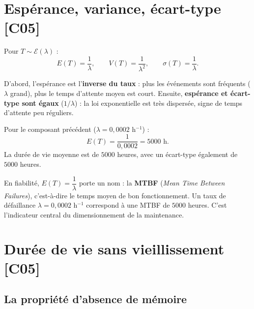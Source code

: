 \documentclass[a4paper,11pt]{article}
\begin{document}
\newpage
\section{Espérance, variance, écart-type \hfill {\normalsize\color{uimmred}[C05]}}

\begin{theoreme}
Pour $T \sim \mathcal{E}(\lambda)$ :
\[
E(T) = \frac{1}{\lambda}, \qquad V(T) = \frac{1}{\lambda^{2}}, \qquad \sigma(T) = \frac{1}{\lambda}.
\]
\end{theoreme}

\begin{remarque}
D'abord, l'espérance est l'\textbf{inverse du taux} : plus les événements sont fréquents ($\lambda$ grand), plus le temps d'attente moyen est court. Ensuite, \textbf{espérance et écart-type sont égaux} ($1/\lambda$) : la loi exponentielle est très dispersée, signe de temps d'attente peu réguliers.
\end{remarque}

\begin{exemple}
Pour le composant précédent ($\lambda = 0{,}0002$ h$^{-1}$) :
\[
E(T) = \frac{1}{0{,}0002} = 5000 \text{ h}.
\]
La durée de vie moyenne est de $5000$ heures, avec un écart-type également de $5000$ heures.
\end{exemple}

\begin{appliindus}[-- La MTBF]
En fiabilité, $E(T) = \dfrac{1}{\lambda}$ porte un nom : la \textbf{MTBF} (\textit{Mean Time Between Failures}), c'est-à-dire le temps moyen de bon fonctionnement. Un taux de défaillance $\lambda = 0{,}0002$ h$^{-1}$ correspond à une MTBF de $5000$ heures. C'est l'indicateur central du dimensionnement de la maintenance.
\end{appliindus}

\newpage
\section{Durée de vie sans vieillissement \hfill {\normalsize\color{uimmred}[C05]}}

\subsection{La propriété d'absence de mémoire}
\end{document}
